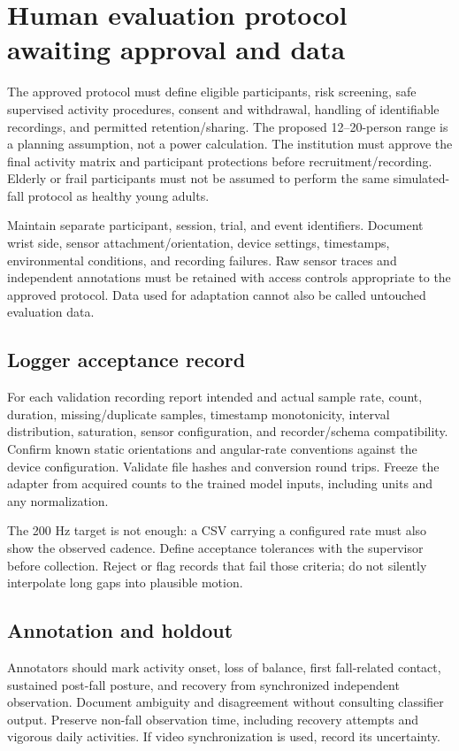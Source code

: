 \section{Human evaluation protocol awaiting approval and data}

The approved protocol must define eligible participants, risk screening, safe supervised activity procedures, consent and withdrawal, handling of identifiable recordings, and permitted retention/sharing. The proposed 12--20-person range is a planning assumption, not a power calculation. The institution must approve the final activity matrix and participant protections before recruitment/recording. Elderly or frail participants must not be assumed to perform the same simulated-fall protocol as healthy young adults.

Maintain separate participant, session, trial, and event identifiers. Document wrist side, sensor attachment/orientation, device settings, timestamps, environmental conditions, and recording failures. Raw sensor traces and independent annotations must be retained with access controls appropriate to the approved protocol. Data used for adaptation cannot also be called untouched evaluation data.

\subsection{Logger acceptance record}
For each validation recording report intended and actual sample rate, count, duration, missing/duplicate samples, timestamp monotonicity, interval distribution, saturation, sensor configuration, and recorder/schema compatibility. Confirm known static orientations and angular-rate conventions against the device configuration. Validate file hashes and conversion round trips. Freeze the adapter from acquired counts to the trained model inputs, including units and any normalization.

The 200 Hz target is not enough: a CSV carrying a configured rate must also show the observed cadence. Define acceptance tolerances with the supervisor before collection. Reject or flag records that fail those criteria; do not silently interpolate long gaps into plausible motion.

\subsection{Annotation and holdout}
Annotators should mark activity onset, loss of balance, first fall-related contact, sustained post-fall posture, and recovery from synchronized independent observation. Document ambiguity and disagreement without consulting classifier output. Preserve non-fall observation time, including recovery attempts and vigorous daily activities. If video synchronization is used, record its uncertainty.


